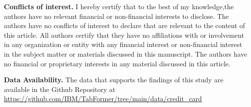 \documentclass[pdflatex,sn-mathphys-num]{sn-jnl}%
\begin{document}
\textbf{Conflicts of interest.} I hereby certify that to the best of my knowledge,the authors have no relevant financial or non-financial interests to disclose. The authors have no conflicts of interest to declare that are relevant to the content of this article. All authors certify that they have no affiliations with or involvement in any organization or entity with any financial interest or non-financial interest in the subject matter or materials discussed in this manuscript. The authors have no financial or proprietary interests in any material discussed in this article. 

\textbf{Data Availability.} The data that supports the findings of this study are available in the Github Repository at \url{https://github.com/IBM/TabFormer/tree/main/data/credit_card}


\end{document}

